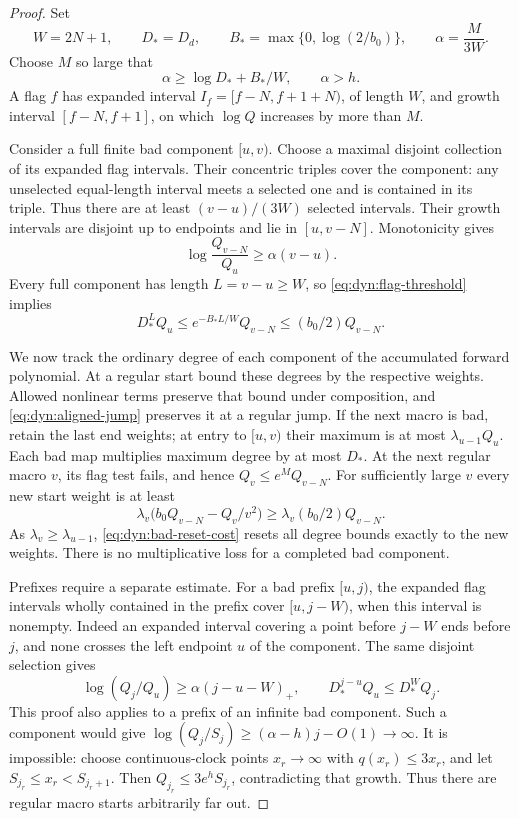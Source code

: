 \documentclass[11pt]{article}
\theoremstyle{definition}
\theoremstyle{remark}
\numberwithin{equation}{section}
\begin{document}
\begin{proof}
Set
\[
 W=2N+1,\qquad D_*=D_d,\qquad
 B_* =\max\{0,\log(2/b_0)\},\qquad \alpha=\frac{M}{3W}.
\]
Choose $M$ so large that
\begin{equation}
 \alpha\ge\log D_*+B_*/W,\qquad \alpha>h.
 \label{eq:dyn:flag-threshold}
\end{equation}
A flag $f$ has expanded interval $I_f=[f-N,f+1+N)$, of length $W$,
and growth interval $[f-N,f+1]$, on which $\log Q$ increases by more
than $M$.

Consider a full finite bad component $[u,v)$.  Choose a maximal
disjoint collection of its expanded flag intervals.  Their concentric
triples cover the component: any unselected equal-length interval
meets a selected one and is contained in its triple.  Thus there are
at least $(v-u)/(3W)$ selected intervals.  Their growth intervals are
disjoint up to endpoints and lie in $[u,v-N]$.  Monotonicity gives
\begin{equation}
 \log\frac{Q_{v-N}}{Q_u}\ge\alpha(v-u).
 \label{eq:dyn:full-bad-growth}
\end{equation}
Every full component has length $L=v-u\ge W$, so
\eqref{eq:dyn:flag-threshold} implies
\begin{equation}
 D_*^L Q_u\le e^{-B_*L/W}Q_{v-N}
             \le(b_0/2)Q_{v-N}.
 \label{eq:dyn:bad-reset-cost}
\end{equation}

We now track the ordinary degree of each component of the accumulated
forward polynomial.  At a regular start bound these degrees by the
respective weights.  Allowed nonlinear terms preserve that bound
under composition, and \eqref{eq:dyn:aligned-jump} preserves it at a
regular jump.  If the next macro is bad, retain the last end weights;
at entry to $[u,v)$ their maximum is at most
$\lambda_{u-1}Q_u$.  Each bad map multiplies maximum degree by at most
$D_*$.  At the next regular macro $v$, its flag test fails, and hence
$Q_v\le e^M Q_{v-N}$.  For sufficiently large $v$ every new start
weight is at least
\[
 \lambda_v\bigl(b_0Q_{v-N}-Q_v/v^2\bigr)
 \ge\lambda_v(b_0/2)Q_{v-N}.
\]
As $\lambda_v\ge\lambda_{u-1}$,
\eqref{eq:dyn:bad-reset-cost} resets all degree bounds exactly to the
new weights.  There is no multiplicative loss for a completed bad
component.

Prefixes require a separate estimate.  For a bad prefix $[u,j)$,
the expanded flag intervals wholly contained in the prefix cover
$[u,j-W)$, when this interval is nonempty.  Indeed an expanded interval
covering a point before $j-W$ ends before $j$, and none crosses the
left endpoint $u$ of the component.  The same disjoint selection gives
\begin{equation}
 \log(Q_j/Q_u)\ge\alpha(j-u-W)_+,
 \qquad D_*^{j-u}Q_u\le D_*^W Q_j.
 \label{eq:dyn:bad-prefix-growth}
\end{equation}
This proof also applies to a prefix of an infinite bad component.
Such a component would give
$\log(Q_j/S_j)\ge(\alpha-h)j-O(1)\to\infty$.
It is impossible: choose continuous-clock points $x_r\to\infty$ with
$q(x_r)\le3x_r$, and let $S_{j_r}\le x_r<S_{j_r+1}$.
Then $Q_{j_r}\le3e^h S_{j_r}$, contradicting that growth.
Thus there are regular macro starts arbitrarily far out.


\end{proof}
\end{document}
